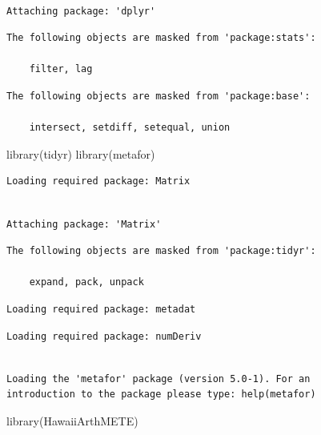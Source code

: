 \documentclass[
  letterpaper,
  DIV=11,
  numbers=noendperiod]{scrartcl}
\newenvironment{Shaded}{\begin{snugshade}}{\end{snugshade}}
\newcommand{\FunctionTok}[1]{\textcolor[rgb]{0.28,0.35,0.67}{#1}}
\newcommand{\NormalTok}[1]{\textcolor[rgb]{0.00,0.23,0.31}{#1}}
\begin{document}
\begin{verbatim}

Attaching package: 'dplyr'
\end{verbatim}

\begin{verbatim}
The following objects are masked from 'package:stats':

    filter, lag
\end{verbatim}

\begin{verbatim}
The following objects are masked from 'package:base':

    intersect, setdiff, setequal, union
\end{verbatim}

\begin{Shaded}
\begin{Highlighting}[]
\FunctionTok{library}\NormalTok{(tidyr)}
\FunctionTok{library}\NormalTok{(metafor)}
\end{Highlighting}
\end{Shaded}

\begin{verbatim}
Loading required package: Matrix
\end{verbatim}

\begin{verbatim}

Attaching package: 'Matrix'
\end{verbatim}

\begin{verbatim}
The following objects are masked from 'package:tidyr':

    expand, pack, unpack
\end{verbatim}

\begin{verbatim}
Loading required package: metadat
\end{verbatim}

\begin{verbatim}
Loading required package: numDeriv
\end{verbatim}

\begin{verbatim}

Loading the 'metafor' package (version 5.0-1). For an
introduction to the package please type: help(metafor)
\end{verbatim}

\begin{Shaded}
\begin{Highlighting}[]
\FunctionTok{library}\NormalTok{(HawaiiArthMETE)}
\end{Highlighting}
\end{Shaded}
\end{document}
